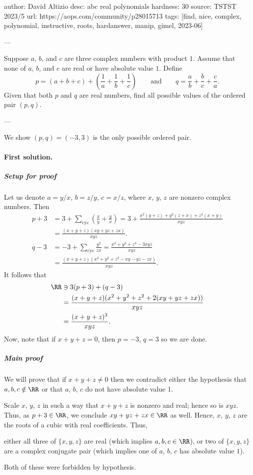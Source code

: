 author: David Altizio
desc: abc real polynomials
hardness: 30
source: TSTST 2023/5
url: https://aops.com/community/p28015713
tags: [find, nice, complex, polynomial, instructive, roots, hardanswer, manip, gimel, 2023-06]

---

Suppose $a$, $b$, and $c$ are three complex numbers with product $1$.
Assume that none of $a$, $b$, and $c$ are real or have absolute value $1$.
Define
\[ p = (a+b+c) + \left( \frac1a+\frac1b+\frac1c \right)
  \qquad\text{and}\qquad
  q = \frac ab + \frac bc + \frac ca. \]
Given that both $p$ and $q$ are real numbers,
find all possible values of the ordered pair $(p,q)$.

---

We show $(p,q) = (-3,3)$ is the only possible ordered pair.

\paragraph{First solution.}
\subparagraph{Setup for proof}
Let us denote $a = y/x$, $b = z/y$, $c = x/z$,
where $x$, $y$, $z$ are nonzero complex numbers.
Then
\begin{align*}
  p + 3 &= 3 + \sum_{\text{cyc}} \left( \frac xy + \frac yx \right)
  = 3 + \frac{x^2(y+z) + y^2(z+x) + z^2(x+y)}{xyz} \\
  &= \frac{(x+y+z)(xy+yz+zx)}{xyz}. \\
  q - 3 &= -3 + \sum_{\text{cyc}} \frac{y^2}{zx}
  = \frac{x^3+y^3+z^3-3xyz}{xyz} \\
  &= \frac{(x+y+z)(x^2+y^2+z^2-xy-yz-zx)}{xyz}.
\end{align*}
It follows that
\begin{align*}
  \RR &\ni 3(p+3) + (q-3) \\
  &= \frac{(x+y+z)(x^2+y^2+z^2+2(xy+yz+zx))}{xyz} \\
  &= \frac{(x+y+z)^3}{xyz}.
\end{align*}
Now, note that if $x+y+z = 0$, then $p = -3$, $q = 3$ so we are done.

\subparagraph{Main proof}
We will prove that if $x+y+z \neq 0$
then we contradict either the hypothesis that $a,b,c \notin \RR$
or that $a$, $b$, $c$ do not have absolute value $1$.

Scale $x$, $y$, $z$ in such a way that $x+y+z$ is nonzero and real;
hence so is $xyz$.
Thus, as $p+3 \in \RR$, we conclude $xy+yz+zx \in \RR$ as well.
Hence, $x$, $y$, $z$ are the roots of a cubic with real coefficients.
Thus,
\begin{itemize}
  \ii either all three of $\{x,y,z\}$ are real (which implies $a,b,c \in \RR$),
  \ii or two of $\{x,y,z\}$ are a complex conjugate pair
  (which implies one of $a$, $b$, $c$ has absolute value $1$).
\end{itemize}
Both of these were forbidden by hypothesis.

